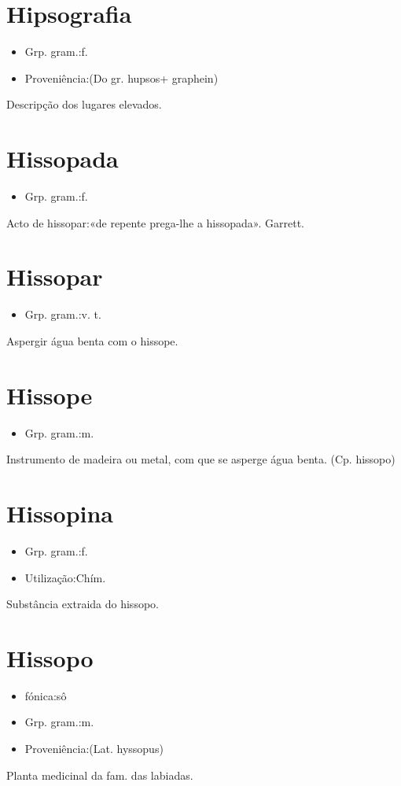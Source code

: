 \documentclass{article}
\begin{document}
\section{Hipsografia}
\begin{itemize}
\item {Grp. gram.:f.}
\end{itemize}
\begin{itemize}
\item {Proveniência:(Do gr. \textunderscore hupsos\textunderscore  + \textunderscore graphein\textunderscore )}
\end{itemize}
Descripção dos lugares elevados.
\section{Hissopada}
\begin{itemize}
\item {Grp. gram.:f.}
\end{itemize}
Acto de hissopar:«\textunderscore de repente prega-lhe a hissopada\textunderscore ». Garrett.
\section{Hissopar}
\begin{itemize}
\item {Grp. gram.:v. t.}
\end{itemize}
Aspergir água benta com o hissope.
\section{Hissope}
\begin{itemize}
\item {Grp. gram.:m.}
\end{itemize}
Instrumento de madeira ou metal, com que se asperge água benta.
(Cp. \textunderscore hissopo\textunderscore )
\section{Hissopina}
\begin{itemize}
\item {Grp. gram.:f.}
\end{itemize}
\begin{itemize}
\item {Utilização:Chím.}
\end{itemize}
Substância extraida do hissopo.
\section{Hissopo}
\begin{itemize}
\item {fónica:sô}
\end{itemize}
\begin{itemize}
\item {Grp. gram.:m.}
\end{itemize}
\begin{itemize}
\item {Proveniência:(Lat. \textunderscore hyssopus\textunderscore )}
\end{itemize}
Planta medicinal da fam. das labiadas.
\end{document}
